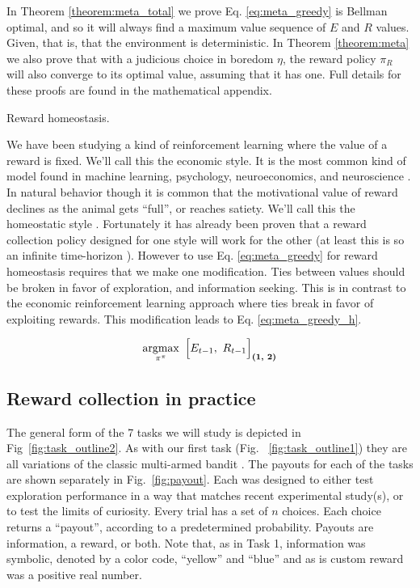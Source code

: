 In Theorem \ref{theorem:meta_total} we prove Eq. \ref{eq:meta_greedy} is Bellman optimal, and so it will always find a maximum value sequence of $E$ and $R$ values. Given, that is, that the environment is deterministic. In Theorem \ref{theorem:meta} we also prove that with a judicious choice in boredom $\eta$, the reward policy $\pi_R$ will also converge to its optimal value, assuming that it has one. Full details for these proofs are found in the mathematical appendix.


\begin{featurebox}
	\caption{Reward homeostasis.}
	\label{box:complexity}
	We have been studying a kind of reinforcement learning where the value of a reward is fixed. We'll call this the economic style. It is the most common kind of model found in machine learning, psychology, neuroeconomics, and neuroscience \citep{Sutton2018}. In natural behavior though it is common that the motivational value of reward declines as the animal gets ``full'', or reaches satiety. We'll call this the homeostatic style \citep{Keramati2014,Juechems2019,Munch2020}.
	Fortunately it has already been proven that a reward collection policy designed for one style will work for the other (at least this is so an infinite time-horizon \citep{Keramati2014}). However to use Eq. \ref{eq:meta_greedy} for reward homeostasis requires that we make one modification. Ties between values should be broken in favor of exploration, and information seeking. This is in contrast to the economic reinforcement learning approach where ties break in favor of exploiting rewards. This modification leads to Eq. \ref{eq:meta_greedy_h}.

	\begin{equation}
		\label{eq:meta_greedy_h} 
			\operatorname*{argmax}_{\pi^{\pi}} \ \Big [ E_{t-1},\ R_{t-1} \Big ]_{\textbf{(1, 2)}}
		\end{equation}
	\medskip
\end{featurebox}

\subsection{Reward collection in practice} The general form of the 7 tasks we will study is depicted in Fig~\ref{fig:task_outline2}. As with our first task (Fig. ~\ref{fig:task_outline1}) they are all variations of the classic multi-armed bandit \citep{Sutton2018}. The payouts for each of the tasks are shown separately in Fig.~\ref{fig:payout}. Each was designed to either test exploration performance in a way that matches recent experimental study(s), or to test the limits of curiosity. Every trial has a set of $n$ choices. Each choice returns a “payout”, according to a predetermined probability. Payouts are information, a reward, or both. Note that, as in Task 1, information was symbolic, denoted by a color code, “yellow” and “blue” and as is custom reward was a positive real number. 

